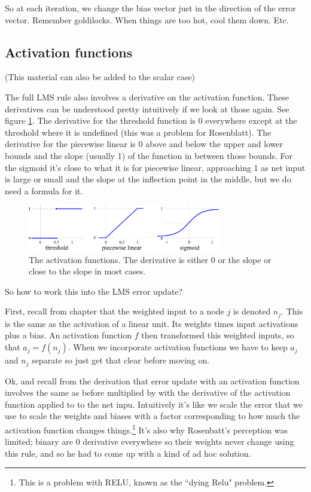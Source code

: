 So at each iteration, we change the bias vector just in the direction of the error vector. Remember goldilocks.  When things are too hot, cool them down. Etc.

\subsection{Activation functions}

(This material can also be added to the scalar case)


The full LMS rule also involves a derivative on the activation function.  These derivatives can be understood pretty intuitively if we look at those again. See figure \ref{derivativesActFunctions}.  The derivative for the threshold function is 0 everywhere except at the threshold where it is undefined (this was a problem for Rosenblatt). The derivative for the piecewise linear is 0 above and below the upper and lower bounds and the slope (usually 1) of the function in between those bounds. For the sigmoid it's close to what it is for piecewise linear, approaching 1 as net input is large or small and the slope at the inflection point in the middle, but we do need a formula for it.

\begin{figure}[h]
\centering
\includegraphics[width=0.75\textwidth]{images/graph_binary.pdf}
\caption[Jeff Yoshimi.]{The activation functions. The derivative is either 0 or the slope or close to the slope in most cases. }
\label{derivativesActFunctions}
\end{figure}

So how to work this into the LMS error update?

First, recall from chapter  that the weighted input to a node $j$ is denoted $n_j$. This is the same as the activation of a linear unit. Its weights times input activations plus a bias.  An activation function $f$ then transformed this weighted inputs, so that $a_j = f(n_j)$.  When we incorporate activation functions we have to keep $a_j$ and $n_j$ separate so just get that clear before moving on.

Ok, and recall from the derivation that error update with an activation function involves the same as before multiplied by with the derivative of the activation function applied to to the net inpu.  Intuitively it's like we scale the error that we use to scale the weights and biases with a factor corresponding to how much the activation function changes things.\footnote{This is a problem with RELU, known as the ``dying Relu" problem.}  It's also why Rosenbatt's perception was limited; binary are 0 derivative everywhere so their weights never change using this rule, and so he had to come up with a kind of ad hoc solution.

